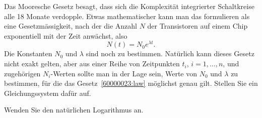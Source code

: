 Das Mooresche Gesetz besagt, dass sich die Komplexität integrierter
Schaltkreise alle 18 Monate verdopple.
Etwas mathematischer kann man das formulieren als eine Gesetzmässigkeit,
nach der die Anzahl $N$ der
Transistoren auf einem Chip exponentiell mit der Zeit anwächst, also
\begin{equation}
N(t) = N_0e^{\lambda t}.
\label{60000023:law}
\end{equation}
Die Konstanten $N_0$ und $\lambda$ sind noch zu bestimmen.
Natürlich kann dieses Gesetz nicht exakt gelten, aber aus einer
Reihe von Zeitpunkten $t_i$, $i=1,\dots,n$, und zugehörigen $N_i$-Werten sollte
man in der Lage sein, Werte von $N_0$ und $\lambda$ zu bestimmen,
für die das Gesetz~\eqref{60000023:law} möglichst genau gilt.
Stellen Sie ein Gleichungssystem dafür auf.

\begin{hinweis}
Wenden Sie den natürlichen Logarithmus an.
\end{hinweis}


